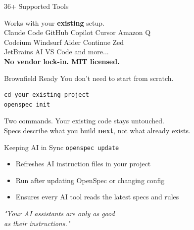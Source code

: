 \documentclass[aspectratio=169,18pt]{beamer}
\begin{document}
\begin{frame}{36+ Supported Tools}
  \vspace{0.5em}
  \begin{center}
    \large Works with your \textbf{existing} setup.\\[1em]
    \normalsize
    Claude Code \textbullet{} GitHub Copilot \textbullet{} Cursor \textbullet{} Amazon Q\\[0.5em]
    Codeium \textbullet{} Windsurf \textbullet{} Aider \textbullet{} Continue \textbullet{} Zed\\[0.5em]
    JetBrains AI \textbullet{} VS Code \textbullet{} and more...\\[1em]
    \textbf{No vendor lock-in. MIT licensed.}
  \end{center}
\end{frame}

\begin{frame}[fragile]{Brownfield Ready}
  \vspace{0.5em}
  \large You don't need to start from scratch.\\[1em]
\begin{lstlisting}
cd your-existing-project
openspec init
\end{lstlisting}
  \vspace{0.8em}
  \normalsize
  Two commands. Your existing code stays untouched.\\[0.5em]
  Specs describe what you build \textbf{next}, not what already exists.
\end{frame}

\begin{frame}[fragile]{Keeping AI in Sync}
  \Large\texttt{openspec update}\\[1em]
  \normalsize
  \begin{itemize}\setlength\itemsep{0.5em}
    \item Refreshes AI instruction files in your project
    \item Run after updating OpenSpec or changing config
    \item Ensures every AI tool reads the latest specs and rules
  \end{itemize}
  \vspace{1em}
  \textit{"Your AI assistants are only as good\\
  as their instructions."}
\end{frame}

\end{document}
